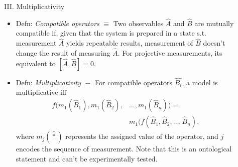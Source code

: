 \documentclass[final,hyperref={pdfpagelabels=false}]{beamer}
\begin{document}
\begin{frame}[t]
\begin{columns}[c]
\begin{column}{.31\textwidth}


    \end{column}

    \begin{column}{.69\textwidth}
      \begin{columns}[c]

        \begin{column}{.012\textwidth}\end{column} %
        \begin{column}{.48\textwidth} %



          \begin{block}{III. Multiplicativity}
            \begin{itemize}

            \item Defn: \emph{Compatible operators} $\equiv$ Two observables $\hat A$ and $\hat B$ are mutually compatible if, given that the system is prepared in a state s.t. measurement $\hat A$ yields repeatable results, measurement of $\hat B$ doesn't change the result of measuring $\hat A$. For projective measurements, its equivalent to $[\hat A, \hat B]=0$. %
              
            \item Defn: \emph{Multiplicativity} $\equiv$ For compatible operators $\hat{B_i}$, a model is multiplicative iff 
              \begin{align} f(m_1(\hat{B}_1),m_1(\hat{B}_2),&\dots,m_1(\hat{B}_n)) = \\
                                                            &m_1(f(\hat{B}_1,\hat{B}_2,\dots,\hat{B}_n),
              \end{align}
              where $m_j(\hat *)$ represents the assigned value of the operator, and $j$ encodes the sequence of measurement. Note that this is an ontological statement and can't be experimentally tested.


\end{itemize}
\end{block}
\end{column}
\end{columns}
\end{column}
\end{columns}
\end{frame}
\end{document}
